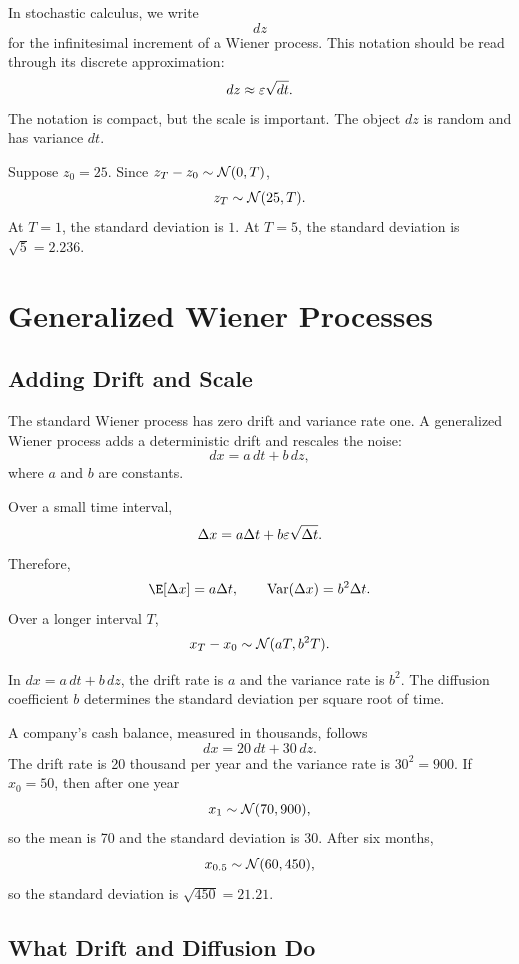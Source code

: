 In stochastic calculus, we write
\[
    dz
\]
for the infinitesimal increment of a Wiener process. This notation should be
read through its discrete approximation:
\[
    dz \approx \varepsilon \sqrt{dt}.
\]
The notation is compact, but the scale is important. The object $dz$ is random
and has variance $dt$.

\begin{exmp}
Suppose $z_0=25$. Since $z_T-z_0\sim\mathcal{N}(0,T)$,
\[
    z_T \sim \mathcal{N}(25,T).
\]
At $T=1$, the standard deviation is $1$. At $T=5$, the standard deviation is
$\sqrt{5}=2.236$.
\end{exmp}

\section{Generalized Wiener Processes}

\subsection{Adding Drift and Scale}

The standard Wiener process has zero drift and variance rate one. A generalized
Wiener process adds a deterministic drift and rescales the noise:
\[
    dx = a\,dt + b\,dz,
\]
where $a$ and $b$ are constants.

Over a small time interval,
\[
    \Delta x = a\Delta t + b\varepsilon\sqrt{\Delta t}.
\]
Therefore,
\[
    \E[\Delta x]=a\dt,
    \qquad
    \Var(\Delta x)=b^2\dt.
\]
Over a longer interval $T$,
\[
    x_T-x_0\sim\mathcal{N}(aT,b^2T).
\]

\begin{defN}
In $dx=a\,dt+b\,dz$, the drift rate is $a$ and the variance rate is $b^2$.
The diffusion coefficient $b$ determines the standard deviation per square root
of time.
\end{defN}

\begin{exmp}
A company's cash balance, measured in thousands, follows
\[
    dx = 20\,dt + 30\,dz.
\]
The drift rate is 20 thousand per year and the variance rate is
$30^2=900$. If $x_0=50$, then after one year
\[
    x_1 \sim \mathcal{N}(70,900),
\]
so the mean is 70 and the standard deviation is 30. After six months,
\[
    x_{0.5}\sim\mathcal{N}(60,450),
\]
so the standard deviation is $\sqrt{450}=21.21$.
\end{exmp}

\subsection{What Drift and Diffusion Do}

